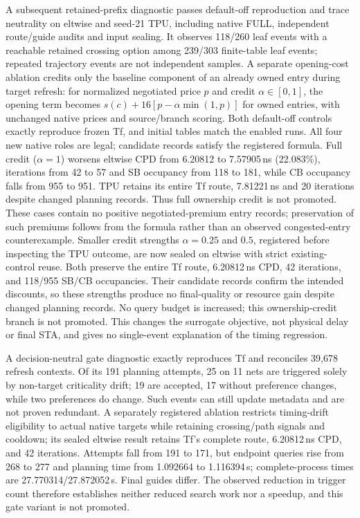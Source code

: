 \documentclass[conference,10pt]{IEEEtran}
\begin{document}
A subsequent retained-prefix diagnostic passes default-off reproduction and trace neutrality on eltwise and seed-21 TPU, including native FULL, independent route/guide audits and input sealing. It observes 118/260 leaf events with a reachable retained crossing option among 239/303 finite-table leaf events; repeated trajectory events are not independent samples. A separate opening-cost ablation credits only the baseline component of an already owned entry during target refresh: for normalized negotiated price $p$ and credit $\alpha\in[0,1]$, the opening term becomes $s(c)+16[p-\alpha\min(1,p)]$ for owned entries, with unchanged native prices and source/branch scoring. Both default-off controls exactly reproduce frozen Tf, and initial tables match the enabled runs. All four new native roles are legal; candidate records satisfy the registered formula. Full credit ($\alpha=1$) worsens eltwise CPD from 6.20812 to 7.57905\,ns (22.083\%), iterations from 42 to 57 and SB occupancy from 118 to 181, while CB occupancy falls from 955 to 951. TPU retains its entire Tf route, 7.81221\,ns and 20 iterations despite changed planning records. Thus full ownership credit is not promoted. These cases contain no positive negotiated-premium entry records; preservation of such premiums follows from the formula rather than an observed congested-entry counterexample. Smaller credit strengths $\alpha=0.25$ and $0.5$, registered before inspecting the TPU outcome, are now sealed on eltwise with strict existing-control reuse. Both preserve the entire Tf route, 6.20812\,ns CPD, 42 iterations, and 118/955 SB/CB occupancies. Their candidate records confirm the intended discounts, so these strengths produce no final-quality or resource gain despite changed planning records. No query budget is increased; this ownership-credit branch is not promoted. This changes the surrogate objective, not physical delay or final STA, and gives no single-event explanation of the timing regression.



A decision-neutral gate diagnostic exactly reproduces Tf and reconciles 39,678 refresh contexts. Of its 191 planning attempts, 25 on 11 nets are triggered solely by non-target criticality drift; 19 are accepted, 17 without preference changes, while two preferences do change. Such events can still update metadata and are not proven redundant. A separately registered ablation restricts timing-drift eligibility to actual native targets while retaining crossing/path signals and cooldown; its sealed eltwise result retains Tf's complete route, 6.20812\,ns CPD, and 42 iterations. Attempts fall from 191 to 171, but endpoint queries rise from 268 to 277 and planning time from 1.092664 to 1.116394\,s; complete-process times are 27.770314/27.872052\,s. Final guides differ. The observed reduction in trigger count therefore establishes neither reduced search work nor a speedup, and this gate variant is not promoted.
\end{document}
